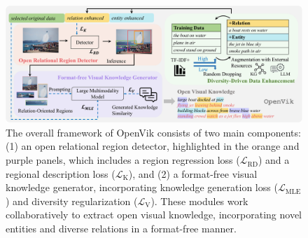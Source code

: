


\begin{figure}[htbp]
    \begin{center}
    \includegraphics[width=.95\columnwidth]{submissions/CarlYang2024/figures/openvik.pdf}
    \end{center}
    \caption{{The overall framework of OpenVik consists of two main components: (1) an open relational region detector, highlighted in the orange and purple panels, which includes a region regression loss ($\mathcal{L}_{\text{RD}}$) and a regional description loss ($\mathcal{L}_{\text{K}}$), and (2) a format-free visual knowledge generator, incorporating knowledge generation loss ($\mathcal{L}_{\text{MLE}}$) and diversity regularization ($\mathcal{L}_{\text{V}}$). These modules work collaboratively to extract open visual knowledge, incorporating novel entities and diverse relations in a format-free manner.}}
    \label{fig:openvik}
\end{figure}



